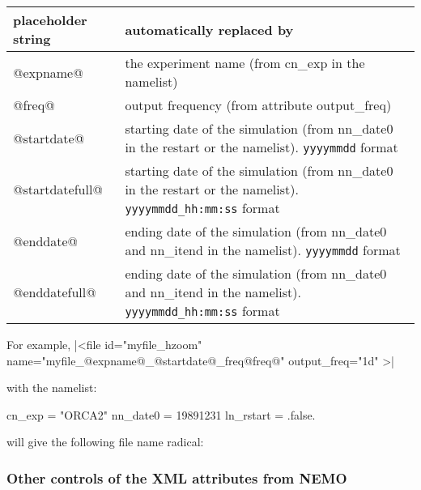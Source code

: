 \documentclass[../main/NEMO_manual]{subfiles}
\begin{document}
\begin{table}
  \scriptsize
  \begin{tabularx}{\textwidth}{|lX|}
    \hline
    \centering placeholder string &
    automatically replaced by                          \\
    \hline
    \hline
    \centering @expname@          &
    the experiment name (from cn\_exp in the namelist) \\
    \hline
    \centering @freq@             &
    output frequency (from attribute output\_freq)     \\
    \hline
    \centering @startdate@        &
    starting date of the simulation (from nn\_date0 in the restart or the namelist).
    \newline
    \verb?yyyymmdd?          format                   \\
    \hline
    \centering @startdatefull@    &
    starting date of the simulation (from nn\_date0 in the restart or the namelist).
    \newline
    \verb?yyyymmdd_hh:mm:ss? format                    \\
    \hline
    \centering @enddate@          &
    ending date of the simulation   (from nn\_date0 and nn\_itend  in the namelist).
    \newline
    \verb?yyyymmdd?          format                    \\
    \hline
    \centering @enddatefull@      &
    ending date of the simulation   (from nn\_date0 and nn\_itend  in the namelist).
    \newline
    \verb?yyyymmdd_hh:mm:ss? format                    \\
    \hline
  \end{tabularx}
\end{table}

\noindent For example, 
\xmlline|<file id="myfile_hzoom" name="myfile_@expname@_@startdate@_freq@freq@" output_freq="1d" >|

\noindent with the namelist:
\begin{forlines}
cn_exp    = "ORCA2"
nn_date0  = 19891231
ln_rstart = .false.
\end{forlines}

\noindent will give the following file name radical: 

\subsubsection{Other controls of the XML attributes from NEMO}
\end{document}
